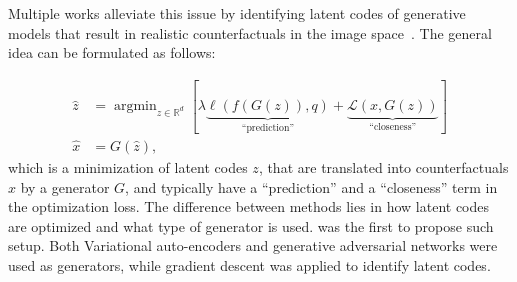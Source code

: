 \documentclass[11pt,a4paper,twoside,openright,final]{memoir}
\makeatletter
\DeclareMathOperator*{\argmin}{\arg\min}
\def\ifdraft{\ifdim\overfullrule>\z@
  \expandafter\@firstoftwo\else\expandafter\@secondoftwo\fi}
\newcommand{\content}[1]{{
    \ifdraft{
        \textcolor{pink}{
            \textbf{\\$\blacktriangleright$} #1\textbf{$\blacktriangleleft$}\\}
    }{}}}
\makeatother
\begin{document}

 
Multiple works alleviate this issue by identifying latent codes of generative models that result in realistic counterfactuals in the image space~\cite{Joshi2018, Rodriguez2021, Singla2019, flowcounterfactuals}.
The general idea can be formulated as follows: 

\begin{align}\label{eq:generator-cf}
    \hat z &= \argmin_{z\in \mathbb{R}^d} [ 
        \lambda   \underbrace{\ell(f(G(z)) , q)}_{\text{``prediction''}}
        +            \underbrace{\mathcal{L}(x , G(z))}_{\text{``closeness''}}]\\
    \hat x &= G(\hat z),
\end{align} 
which is a minimization of latent codes $z$, that are translated into counterfactuals $\hat x$ by a generator $G$, and typically have a ``prediction'' and a ``closeness'' term in the optimization loss.
The difference between methods lies in how latent codes are optimized and what type of generator is used. 
\cite{Joshi2018} was the first to propose such setup.
Both Variational auto-encoders and generative adversarial networks were used as generators, while gradient descent was applied to identify latent codes. 
\end{document}
